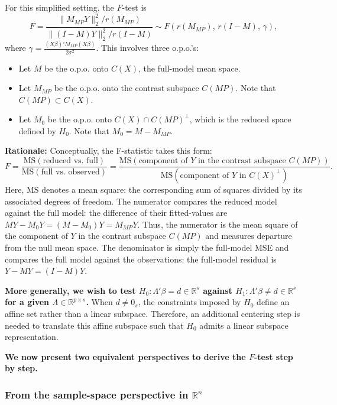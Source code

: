 \documentclass{article}
\theoremstyle{break}
\newcommand{\R}{\ensuremath{\mathbb{R}}}
\begin{document}
For this simplified setting, the $F$-test is
\[
F=\frac{\|M_{MP}Y\|_2^2 / r(M_{MP})}{\|(I-M)Y\|_2^2 / r(I-M)} 
\sim F(r(M_{MP}),\, r(I-M),\, \gamma),
\]
where $\gamma = \frac{(X\beta)' M_{MP} (X\beta)}{2 \sigma^2}$.
This involves three o.p.o.'s:
\begin{itemize}
    \item Let $M$ be the o.p.o. onto $C(X)$, the full-model mean space.
    \item Let $M_{MP}$ be the o.p.o. onto the contrast subspace $C(MP)$. Note that $C(MP) \subset C(X)$.
    \item Let $M_0$ be the o.p.o. onto $C(X) \cap C(MP)^\perp$, which is the reduced space defined by $H_0$. Note that $M_0 = M - M_{MP}$.
\end{itemize}

\textbf{Rationale:}
Conceptually, the F-statistic takes this form:
\[
F = \frac{\mathrm{MS}(\text{reduced vs. full})}{\mathrm{MS}(\text{full vs. observed})} =\frac{\mathrm{MS}(\text{component of $Y$ in the contrast subspace $C(MP)$})}{\mathrm{MS}(\text{component of $Y$ in $C(X)^\perp$})}.
\]
Here, \(\mathrm{MS}\) denotes a mean square: the corresponding sum of squares divided by its associated degrees of freedom.
The numerator compares the reduced model against the full model: the difference of their fitted-values are $MY-M_0Y=(M-M_0)Y=M_{MP}Y$. Thus, the numerator is the mean square of the component of $Y$ in the contrast subspace $C(MP)$ and measures departure from the null mean space.
The denominator is simply the full-model MSE and compares the full model against the observations: the full-model residual is $Y-MY=(I-M)Y$. 


\textbf{More generally, we wish to test $H_0: \Lambda'\beta = d \in \R^s$ against $H_1: \Lambda'\beta \neq d \in \R^s$ for a given $\Lambda \in \R^{p\times s}$.} 
When $d\neq 0_s$, the constraints imposed by $H_0$ define an affine set rather than a linear subspace. Therefore, an additional centering step is needed to translate this affine subspace such that $H_0$ admits a linear subspace representation.

\textbf{We now present two equivalent perspectives to derive the $F$-test step by step.}

\subsubsection{From the sample-space perspective in $\R^n$}
\end{document}
